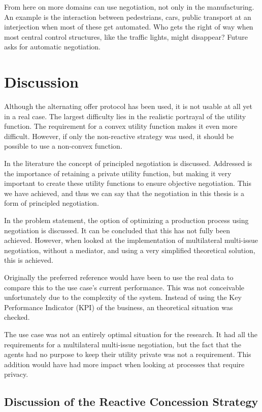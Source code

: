 From here on more domains can use negotiation, not only in the manufacturing. An example is the interaction between pedestrians, cars, public transport at an interjection when most of these get automated. Who gets the right of way when most central control structures, like the traffic lights, might disappear? Future asks for automatic negotiation.

\section{Discussion}
Although the alternating offer protocol has been used, it is not usable at all yet in a real case. The largest difficulty lies in the realistic portrayal of the utility function. The requirement for a convex utility function makes it even more difficult. However, if only the non-reactive strategy was used, it should be possible to use a non-convex function.

In the literature the concept of principled negotiation is discussed. Addressed is the importance of retaining a private utility function, but making it very important to create these utility functions to ensure objective negotiation. This we have achieved, and thus we can say that the negotiation in this thesis is a form of principled negotiation.

In the problem statement, the option of optimizing a production process using negotiation is discussed. It can be concluded that this has not fully been achieved. However, when looked at the implementation of multilateral multi-issue negotiation, without a mediator, and using a very simplified theoretical solution, this is achieved. 

Originally the preferred reference would have been to use the real data to compare this to the use case's current performance. This was not conceivable unfortunately due to the complexity of the system. Instead of using the Key Performance Indicator (KPI) of the business, an theoretical situation was checked. 

The use case was not an entirely optimal situation for the research. It had all the requirements for a multilateral multi-issue negotiation, but the fact that the agents had no purpose to keep their utility private was not a requirement. This addition would have had more impact when looking at processes that require privacy.

\subsection{Discussion of the Reactive Concession Strategy}

